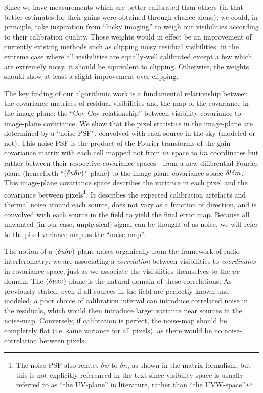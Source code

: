 \pg
Since we have measurements which are better-calibrated than others (in that better estimates for their gains were obtained through chance alone), we could, in principle, take inspiration from ``lucky imaging'' \citep[an optical-domain method for making good images: for more details, see][and references therein]{1978JOSA...68.1651F} to weigh our visibilities according to their calibration quality. 
{Those weights would in effect be an improvement of currently existing methods such as clipping noisy residual visibilities: in the extreme case where all visibilities are equally-well calibrated except a few which are extremely noisy, it should be equivalent to clipping. Otherwise, the weights should show at least a slight improvement over clipping.}

\pg
The key finding of our algorithmic work is a fundamental relationship between the covariance matrices of residual visibilities and the map of the covariance in the image-plane: the ``Cov-Cov relationship'' between visibility covariance to image-plane covariance. We show that the pixel statistics in the image-plane are determined by a ``noise-PSF'', convolved with each source in the sky (modeled or not). This noise-PSF is the product of the Fourier transforms of the gain covariance matrix with each cell mapped not from $uv$ space to $lm$ coordinates but rather between their respective covariance spaces - from a new {differential Fourier plane (henceforth ``$\left(\delta u\delta v\right)$''-plane) to the image-plane covariance space $\delta l\delta m$. This image-plane covariance space describes} the variance in each pixel and the covariance between pixels\footnote{{The noise-PSF also relates $\delta w$ to $\delta n$, as shown in the matrix formalism, but this is not explicitly referenced in the text since visibility space is usually referred to as ``the UV-plane'' in literature, rather than ``the UVW-space''.}}. It describes the expected calibration artefacts and thermal noise around each source, does not vary as a function of direction, and is convolved with each source in the field to yield the final error map. Because all unwanted (in our case, unphysical) signal can be thought of as noise, we will refer to {the pixel variance map} as the ``noise-map''.

\pg
The notion of a $\left(\delta u\delta v\right)$-plane arises organically from the framework of radio interferometry: we are associating a \emph{correlation} between visibilities to \emph{coordinates} in covariance space, {just as we associate} the visibilities themselves to the $uv$-domain. The $\left(\delta u\delta v\right)$-plane is the natural domain of these correlations. As previously stated, even if all sources in the field are perfectly known and modeled, a poor choice of calibration interval can introduce correlated noise in the residuals, which would then introduce larger variance near sources in the noise-map. Conversely, if calibration is perfect, the noise-map should be completely flat {(i.e. same variance for all pixels)}, as there would be no noise-correlation between pixels.

